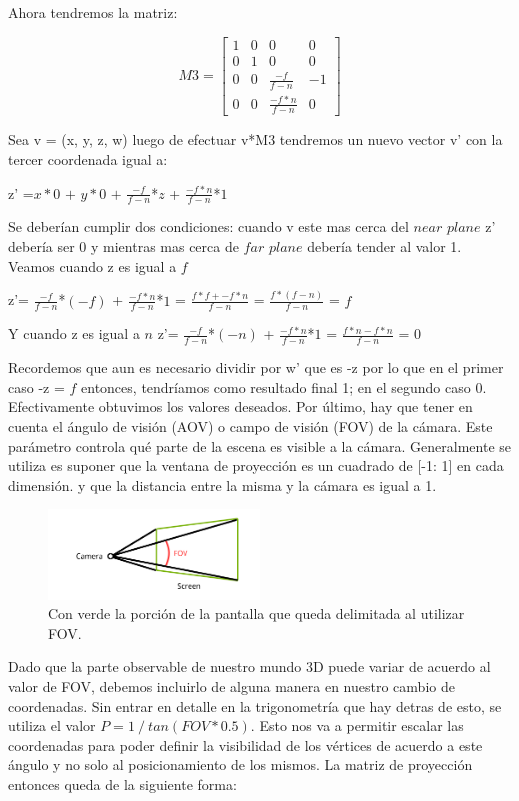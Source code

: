 \documentclass[a4paper]{article}
\begin{document}
Ahora tendremos la matriz:

\[
M3 =
\begin{bmatrix}
1 & 0 & 0 & 0 \\
0 & 1 & 0 & 0 \\
0 & 0 & \frac{-f}{f-n} & -1 \\
0 & 0 & \frac{-f*n}{f-n} & 0  
\end{bmatrix}
\]

Sea v = (x, y, z, w) luego de efectuar v*M3 tendremos un nuevo vector v' con la tercer coordenada igual a: 


z' =$x*0$ $+$ $y*0$ $+$ $\frac{-f}{f-n}$*$z$ + $\frac{-f*n}{f-n}$*$1$

Se deberían cumplir dos condiciones: cuando v este mas cerca del $near$ $plane$ z' debería ser 0 y mientras mas cerca de $far$ $plane$ debería tender al valor 1. 
 Veamos cuando z es igual a $f$
 
 z'= $\frac{-f}{f-n}$*$(-f)$ + $\frac{-f*n}{f-n}$*$1$ = $\frac{f*f + -f*n}{f-n}$ = $\frac{f*(f-n)}{f-n}$ = $f$
 
 
 Y cuando z es igual a $n$
 z'= $\frac{-f}{f-n}$*$(-n)$ + $\frac{-f*n}{f-n}$*$1$ = $\frac{f*n - f*n}{f-n}$ = $0$
 
Recordemos que aun es necesario dividir por w' que es -z por lo que en el primer caso -z = $f$ entonces, tendríamos como resultado final 1; en el segundo caso 0. Efectivamente obtuvimos los valores deseados.
Por último, hay que tener en cuenta el ángulo de visión (AOV)  o campo de visión (FOV) de la cámara. Este parámetro controla qué parte de la escena es visible a la cámara.\newline
Generalmente se utiliza es suponer que la ventana de proyección es un cuadrado de [-1: 1] en cada dimensión. y que la distancia entre la misma y la cámara es igual a 1. 


\begin{figure}[h]
    \centering
    \includegraphics[width=0.50\textwidth]{Imagenes/d.png}
    \caption{Con verde la porción de la pantalla que queda delimitada al utilizar FOV.}
    \label{fig:mesh1}
\end{figure}


Dado que la parte observable de nuestro mundo 3D puede variar de acuerdo al valor de FOV, debemos incluirlo de alguna manera en nuestro cambio de coordenadas. Sin entrar en detalle en la trigonometría que hay detras de esto, se utiliza el valor $P = 1 \ / \ tan(FOV * 0.5)$. Esto nos va a permitir escalar las coordenadas para poder definir la visibilidad de los vértices de acuerdo a este ángulo y no solo al posicionamiento de los mismos.
La matriz de proyección entonces queda de la siguiente forma:
\end{document}
